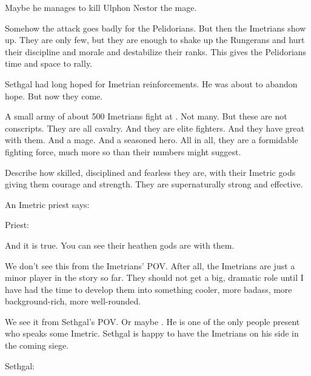 Maybe he manages to {kill Ulphon Nestor the mage}.




\begin{comment}
  \section{Imetrians to the rescue}
\end{comment}
\new
Somehow the attack goes badly for the Pelidorians.
But then the Imetrians show up.
They are only few, but they are enough to shake up the Rungerans and hurt their discipline and morale and destabilize their ranks.
This gives the Pelidorians time and space to rally.

Sethgal had long hoped for Imetrian reinforcements. 
He was about to abandon hope.
But now they come.

A small army of about 500 Imetrians fight at \Forclin. 
Not many. 
But these are not conscripts.
They are all cavalry.
And they are elite fighters.
And they have great \saurians with them. 
And a mage.
And a seasoned hero.
All in all, they are a formidable fighting force, much more so than their numbers might suggest. 

Describe how skilled, disciplined and fearless they are, with their Imetric gods giving them courage and strength. 
They are supernaturally strong and effective.

An Imetric priest says: 

\begin{prose}
  Priest: 
\end{prose}

And it is true. 
You can see their heathen gods are with them. 

We don't see this from the Imetrians' POV. 
After all, the Imetrians are just a minor player in the story so far. 
They should not get a big, dramatic role until I have had the time to develop them into something cooler, more badass, more background-rich, more well-rounded. 

We see it from Sethgal's POV. 
Or maybe \Dornaer. 
He is one of the only people present who speaks some Imetric. 
Sethgal is happy to have the Imetrians on his side in the coming siege.

\begin{prose}
  Sethgal: 
  
\end{prose}

